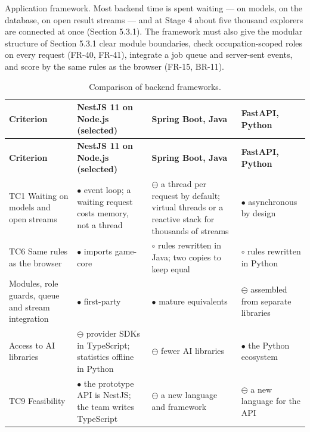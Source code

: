 Application framework. Most backend time is spent waiting --- on models, on the database, on open result streams --- and at Stage 4 about five thousand explorers are connected at once (Section 5.3.1). The framework must also give the modular structure of Section 5.3.1 clear module boundaries, check occupation-scoped roles on every request (FR-40, FR-41), integrate a job queue and server-sent events, and score by the same rules as the browser (FR-15, BR-11).

{\small
\begin{longtable}{|>{\raggedright\arraybackslash}p{}|>{\raggedright\arraybackslash}p{}|>{\raggedright\arraybackslash}p{}|>{\raggedright\arraybackslash}p{}|}
\caption{Comparison of backend frameworks.} \\
\hline
\textbf{Criterion} & \textbf{NestJS 11 on Node.js (selected)} & \textbf{Spring Boot, Java\cite{r179}} & \textbf{FastAPI, Python\cite{r181}} \\ \hline
\endfirsthead
\hline
\textbf{Criterion} & \textbf{NestJS 11 on Node.js (selected)} & \textbf{Spring Boot, Java\cite{r179}} & \textbf{FastAPI, Python\cite{r181}} \\ \hline
\endhead
TC1 Waiting on models and open streams & $\bullet$ event loop; a waiting request costs memory, not a thread & $\ominus$ a thread per request by default; virtual threads\cite{r180} or a reactive stack for thousands of streams & $\bullet$ asynchronous by design \\ \hline
TC6 Same rules as the browser & $\bullet$ imports game-core & $\circ$ rules rewritten in Java; two copies to keep equal & $\circ$ rules rewritten in Python \\ \hline
Modules, role guards, queue and stream integration & $\bullet$ first-party\cite{r149} & $\bullet$ mature equivalents & $\ominus$ assembled from separate libraries \\ \hline
Access to AI libraries & $\ominus$ provider SDKs in TypeScript; statistics offline in Python & $\ominus$ fewer AI libraries & $\bullet$ the Python ecosystem \\ \hline
TC9 Feasibility & $\bullet$ the prototype API is NestJS; the team writes TypeScript & $\ominus$ a new language and framework & $\ominus$ a new language for the API \\ \hline
\end{longtable}
}

